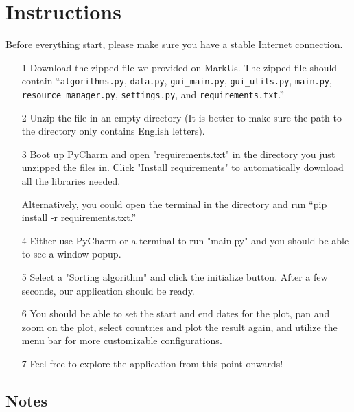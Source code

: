 \documentclass[fontsize=11pt]{article}
\begin{document}
    \newpage

    \section{Instructions}

    Before everything start, please make sure you have a stable Internet connection.

    \begin{enumerate}
        \item [1]
            Download the zipped file we provided on MarkUs. The zipped file should contain ``\verb|algorithms.py|, \verb|data.py|, \verb|gui_main.py|, \verb|gui_utils.py|, \verb|main.py|, \verb|resource_manager.py|, \verb|settings.py|, and \verb|requirements.txt|.''

        \item [2]
            Unzip the file in an empty directory (It is better to make sure the path to the directory only contains English letters).
        \item [3]
            Boot up PyCharm and open "requirements.txt" in the directory you just unzipped the files in. Click "Install requirements" to automatically download all the libraries needed.

            Alternatively, you could open the terminal in the directory and run ``pip install -r requirements.txt.''

        \item [4]
            Either use PyCharm or a terminal to run "main.py" and you should be able to see a window popup.

        \item [5]
            Select a "Sorting algorithm" and click the initialize button. After a few seconds, our application should be ready.

        \item [6]
            You should be able to set the start and end dates for the plot, pan and zoom on the plot, select countries and plot the result again, and utilize the menu bar for more customizable configurations.

        \item [7]
            Feel free to explore the application from this point onwards!

    \end{enumerate}

    \subsection{Notes}
\end{document}
